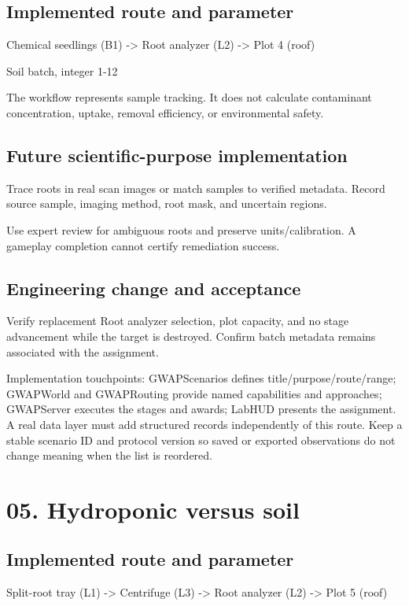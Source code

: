\subsection{Implemented route and parameter}
Chemical seedlings (B1) -> Root analyzer (L2) -> Plot 4 (roof)

Soil batch, integer 1-12

The workflow represents sample tracking.\allowbreak{} It does not calculate contaminant concentration, uptake, removal efficiency, or environmental safety.\allowbreak{}

\subsection{Future scientific-purpose implementation}
Trace roots in real scan images or match samples to verified metadata.\allowbreak{} Record source sample, imaging method, root mask, and uncertain regions.\allowbreak{}

Use expert review for ambiguous roots and preserve units/\allowbreak{}calibration.\allowbreak{} A gameplay completion cannot certify remediation success.\allowbreak{}

\subsection{Engineering change and acceptance}
Verify replacement Root analyzer selection, plot capacity, and no stage advancement while the target is destroyed.\allowbreak{} Confirm batch metadata remains associated with the assignment.\allowbreak{}

Implementation touchpoints: GWAPScenarios defines title/\allowbreak{}purpose/\allowbreak{}route/\allowbreak{}range; GWAPWorld and GWAPRouting provide named capabilities and approaches; GWAPServer executes the stages and awards; LabHUD presents the assignment.\allowbreak{} A real data layer must add structured records independently of this route.\allowbreak{} Keep a stable scenario ID and protocol version so saved or exported observations do not change meaning when the list is reordered.\allowbreak{}

\section{05.\allowbreak{} Hydroponic versus soil}
\subsection{Implemented route and parameter}
Split-root tray (L1) -> Centrifuge (L3) -> Root analyzer (L2) -> Plot 5 (roof)

